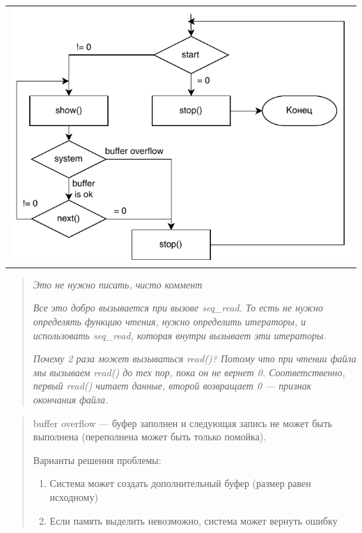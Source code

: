 \begin{table}[h!]
  \centering
  \begin{tabular}{p{1\linewidth}}
    \centering
    \includegraphics[width=0.95\linewidth]{./images/seq.pdf}
  \end{tabular}
\end{table}

\begin{quote}
	\textit{Это не нужно писать, чисто коммент}

	\textit{Все это добро вызывается при вызове seq\_read. То есть не нужно определять функцию чтения, нужно определить итераторы, и использовать seq\_read, которая внутри вызывает эти итераторы.}
	
	\textit{Почему 2 раза может вызываться read()? Потому что при чтении файла мы вызываем read() до тех пор, пока он не вернет 0. Соответственно, первый read() читает данные, второй возвращает 0 --- признак окончания файла.}
\end{quote}

\begin{quote}
buffer overflow --- буфер заполнен и следующая запись не может быть выполнена (переполнена может быть только помойка).

Варианты решения проблемы:
\begin{enumerate}
\item Система может создать дополнительный буфер (размер равен исходному)
\item Если память выделить невозможно, система может вернуть ошибку
\end{enumerate}
\end{quote}

